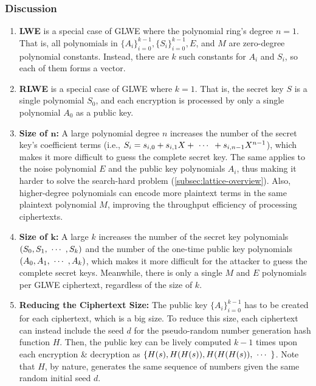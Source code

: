 \subsubsection{Discussion}
\begin{enumerate}
\item \textbf{LWE} is a special case of GLWE where the polynomial ring's degree $n = 1$. That is, all polynomials in $\{A_i\}_{i=0}^{k-1}, \{S_i\}_{i=0}^{k-1}, E$, and $M$ are zero-degree polynomial constants. Instead, there are $k$ such constants for $A_i$ and $S_i$, so each of them forms a vector.
\item \textbf{RLWE} is a special case of GLWE where $k = 1$. That is, the secret key $S$ is a single polynomial $S_0$, and each encryption is processed by only a single polynomial $A_0$ as a public key.
\item \textbf{Size of $\bm{n}$:} A large polynomial degree $n$ increases the number of the secret key's coefficient terms (i.e., $S_i = s_{i,0} + s_{i,1}X + \text{ } \text{$\cdots$} \text{ } + s_{i, n-1}X^{n-1} $), which makes it more difficult to guess the complete secret key. The same applies to the noise polynomial $E$ and the public key polynomials $A_i$, thus making it harder to solve the search-hard problem (\autoref{subsec:lattice-overview}). Also, higher-degree polynomials can encode more plaintext terms in the same plaintext polynomial $M$, improving the throughput efficiency of processing ciphertexts.
\item \textbf{Size of $\bm{k}$:} A large $k$ increases the number of the secret key polynomials $(S_0, S_1, \text{ } \text{$\cdots$} \text{ }, S_k)$ and the number of the one-time public key polynomials $(A_0, A_1, \text{ } \text{$\cdots$} \text{ }, A_k)$, which makes it more difficult for the attacker to guess the complete secret keys. Meanwhile, there is only a single $M$ and $E$ polynomials per GLWE ciphertext, regardless of the size of $k$. 
\item \textbf{Reducing the Ciphertext Size:} The public key $\{A_i\}_{i=0}^{k-1}$ has to be created for each ciphertext, which is a big size. To reduce this size, each ciphertext can instead include the seed $d$ for the pseudo-random number generation hash function $H$. Then, the public key can be lively computed $k-1$ times upon each encryption \& decryption as $\{H(s), H(H(s)), H(H(H(s)), \text{ } \text{$\cdots$} \text{ } \}$. Note that $H$, by nature, generates the same sequence of numbers given the same random initial seed $d$. 
\end{enumerate}

